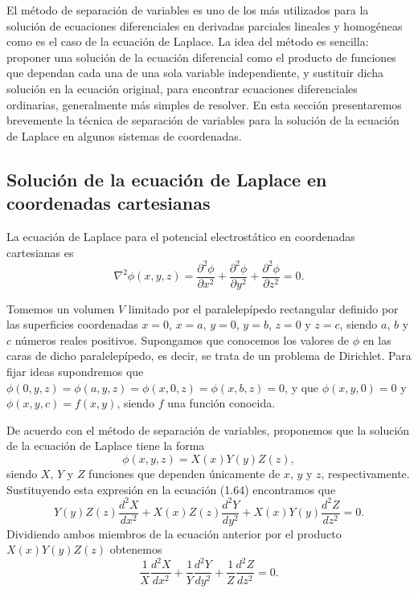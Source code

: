 \documentclass[12pt,a4paper]{book}
\begin{document}
El método de separación de variables es uno de los más utilizados para la solución de ecuaciones diferenciales en derivadas parciales lineales y homogéneas como es el caso de la ecuación de Laplace. La idea del método es sencilla: proponer una solución de la ecuación diferencial como el producto de funciones que dependan cada una de una sola variable independiente, y sustituir dicha solución en la ecuación original, para encontrar ecuaciones diferenciales ordinarias, generalmente más simples de resolver. En esta sección presentaremos brevemente la técnica de separación de variables para la solución de la ecuación de Laplace en algunos sistemas de coordenadas.

\subsection{Solución de la ecuación de Laplace en coordenadas cartesianas}

La ecuación de Laplace para el potencial electrostático en coordenadas cartesianas es
\begin{equation}
\nabla^2 \phi(x, y, z) = \frac{\partial^2\phi}{\partial x^2} + \frac{\partial^2\phi}{\partial y^2} + \frac{\partial^2\phi}{\partial z^2} = 0.
\end{equation}

Tomemos un volumen $V$ limitado por el paralelepípedo rectangular definido por las superficies coordenadas $x = 0$, $x = a$, $y = 0$, $y = b$, $z = 0$ y $z = c$, siendo $a$, $b$ y $c$ números reales positivos. Supongamos que conocemos los valores de $\phi$ en las caras de dicho paralelepípedo, es decir, se trata de un problema de Dirichlet. Para fijar ideas supondremos que $\phi(0, y, z) = \phi(a, y, z) = \phi(x, 0, z) = \phi(x, b, z) = 0$, y que $\phi(x, y, 0) = 0$ y $\phi(x, y, c) = f(x, y)$, siendo $f$ una función conocida.

De acuerdo con el método de separación de variables, proponemos que la solución de la ecuación de Laplace tiene la forma
\begin{equation}
\phi(x, y, z) = X(x)Y(y)Z(z),
\end{equation}
siendo $X$, $Y$ y $Z$ funciones que dependen únicamente de $x$, $y$ y $z$, respectivamente. Sustituyendo esta expresión en la ecuación (1.64) encontramos que
\begin{equation}
Y(y)Z(z)\frac{d^2X}{dx^2} + X(x)Z(z)\frac{d^2Y}{dy^2} + X(x)Y(y)\frac{d^2Z}{dz^2} = 0.
\end{equation}
Dividiendo ambos miembros de la ecuación anterior por el producto $X(x)Y(y)Z(z)$ obtenemos
\begin{equation}
\frac{1}{X}\frac{d^2X}{dx^2} + \frac{1}{Y}\frac{d^2Y}{dy^2} + \frac{1}{Z}\frac{d^2Z}{dz^2} = 0.
\end{equation}
\end{document}
